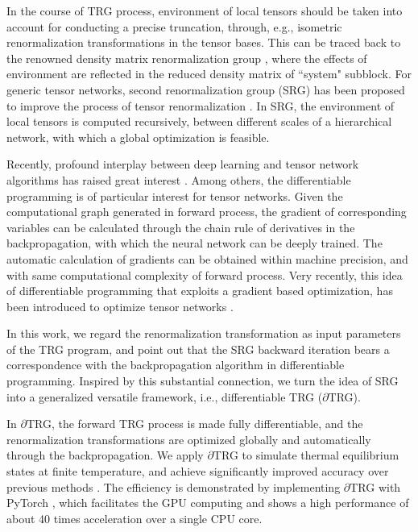 \documentclass[aps,prx,twocolumn,showpacs,psfig,superscriptaddress,longbibliography]{revtex4-1}
\def\dTRG{$\partial$TRG\xspace}
\begin{document}
In the course of TRG process, environment of local tensors should 
be taken into account for conducting a precise truncation,
through, e.g., isometric renormalization transformations 
in the tensor bases. This can be traced back to 
the renowned density matrix renormalization group \cite{White1992}, where the effects of environment 
are reflected in the reduced density matrix of ``system" subblock. 
For generic tensor networks, second renormalization group (SRG) 
has been proposed to improve the process of tensor renormalization
\cite{Xie2009,SRG-PRB2010,Xie2012,HOSRG-PRB2016}. 
In SRG, the environment of local tensors is computed
recursively, between different scales of a hierarchical network, 
with which a global optimization is feasible. 

Recently, profound interplay between deep learning and tensor network algorithms has raised great interest \cite{Carleo2017, Carrasquilla2017,Nieuwenburg2017,Stoudenmire2016,Foreman2018,Han2018,Guo2018,SHLi2018,Koch-Janusz2018}. Among others, 
the differentiable programming is of particular interest for tensor networks. 
Given the computational graph generated in forward process, 
the gradient of corresponding variables can be calculated through the 
chain rule of derivatives in the backpropagation, with which the neural 
network can be deeply trained. The automatic calculation of gradients can 
be obtained within machine precision, and with same computational 
complexity of forward process. Very recently, this idea of differentiable 
programming that exploits a gradient based optimization, has been introduced to optimize tensor networks \cite{Liao2019}. 

In this work, we regard the renormalization transformation as input parameters of the TRG program, and point out that the SRG backward iteration bears a correspondence with the backpropagation algorithm in differentiable programming. Inspired by this substantial connection, we turn the idea of SRG into a generalized versatile framework, i.e., differentiable TRG (\dTRG). 

In \dTRG, the forward TRG process is made fully differentiable, and the renormalization transformations are optimized globally and automatically through the backpropagation. We apply \dTRG to simulate thermal equilibrium states at finite temperature, and achieve significantly improved accuracy over previous methods \cite{Li.w+:2011:LTRG,Chen2018}. The efficiency is demonstrated by implementing \dTRG with PyTorch \cite{Pytorch,pytorch}, which facilitates the GPU computing and shows a high performance of about 40 times acceleration over a single CPU core.
\end{document}

